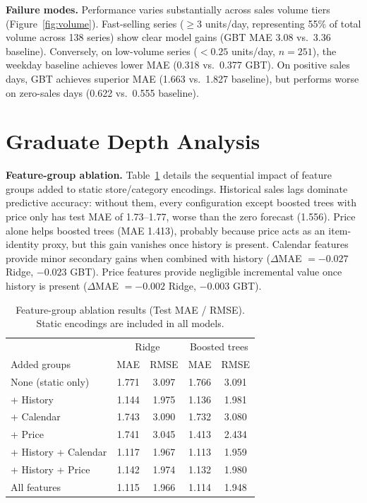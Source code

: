 \documentclass{article}
\begin{document}
\textbf{Failure modes.} Performance varies substantially across sales volume tiers (Figure~\ref{fig:volume}). Fast-selling series ($\ge3$ units/day, representing 55\% of total volume across 138 series) show clear model gains (GBT MAE 3.08 vs.\ 3.36 baseline). Conversely, on low-volume series ($<0.25$ units/day, $n=251$), the weekday baseline achieves lower MAE (0.318 vs.\ 0.377 GBT). On positive sales days, GBT achieves superior MAE (1.663 vs.\ 1.827 baseline), but performs worse on zero-sales days (0.622 vs.\ 0.555 baseline).

\section{Graduate Depth Analysis}
\textbf{Feature-group ablation.} Table~\ref{tab:abl} details the sequential impact of feature groups added to static store/category encodings. Historical sales lags dominate predictive accuracy: without them, every configuration except boosted trees with price only has test MAE of 1.73--1.77, worse than the zero forecast (1.556). Price alone helps boosted trees (MAE 1.413), probably because price acts as an item-identity proxy, but this gain vanishes once history is present. Calendar features provide minor secondary gains when combined with history ($\Delta$MAE $=-0.027$ Ridge, $-0.023$ GBT). Price features provide negligible incremental value once history is present ($\Delta$MAE $=-0.002$ Ridge, $-0.003$ GBT).

\begin{table}[t]
\caption{Feature-group ablation results (Test MAE / RMSE). Static encodings are included in all models.}
\label{tab:abl}
\centering
\begin{tabular}{lcccc}
\toprule
 & \multicolumn{2}{c}{Ridge} & \multicolumn{2}{c}{Boosted trees} \\
Added groups & MAE & RMSE & MAE & RMSE \\
\midrule
None (static only) & 1.771 & 3.097 & 1.766 & 3.091 \\
+ History & 1.144 & 1.975 & 1.136 & 1.981 \\
+ Calendar & 1.743 & 3.090 & 1.732 & 3.080 \\
+ Price & 1.741 & 3.045 & 1.413 & 2.434 \\
+ History + Calendar & 1.117 & 1.967 & 1.113 & 1.959 \\
+ History + Price & 1.142 & 1.974 & 1.132 & 1.980 \\
All features & 1.115 & 1.966 & 1.114 & 1.948 \\
\bottomrule
\end{tabular}
\end{table}
\end{document}

